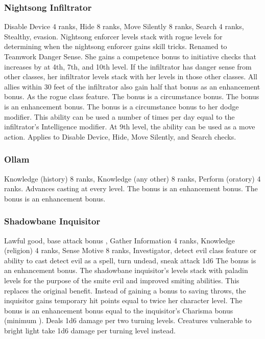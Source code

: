 \subsubsection{Nightsong Infiltrator}
 Disable Device 4 ranks, Hide 8 ranks, Move Silently 8 ranks, Search 4 ranks, Stealthy, evasion.
 Nightsong enforcer levels stack with rogue levels for determining when the nightsong enforcer gains skill tricks.
 Renamed to Teamwork Danger Sense. She gains a  competence bonus to initiative checks that increases by  at 4th, 7th, and 10th level. If the infiltrator has danger sense from other classes, her infiltrator levels stack with her levels in those other classes. All allies within 30 feet of the infiltrator also gain half that bonus as an enhancement bonus.
 As the rogue class feature.
 The bonus is a circumstance bonus.
 The bonus is an enhancement bonus.
 The bonus is a circumstance bonus to her dodge modifier.
 This ability can be used a number of times per day equal to the infiltrator's Intelligence modifier. At 9th level, the ability can be used as a move action.
 Applies to Disable Device, Hide, Move Silently, and Search checks.
\subsubsection{Ollam}
 Knowledge (history) 8 ranks, Knowledge (any other) 8 ranks, Perform (oratory) 4 ranks.
 Advances casting at every level.
 The bonus is an enhancement bonus.
 The bonus is an enhancement bonus.
\subsubsection{Shadowbane Inquisitor}
 Lawful good, base attack bonus , Gather Information 4 ranks, Knowledge (religion) 4 ranks, Sense Motive 8 ranks, Investigator, detect evil class feature or ability to cast detect evil as a spell, turn undead, sneak attack \plus1d6
 The bonus is an enhancement bonus.
 The shadowbane inquisitor's levels stack with paladin levels for the purpose of the smite evil and improved smiting abilities. This replaces the original benefit.
 Instead of gaining a bonus to saving throws, the inquisitor gains temporary hit points equal to twice her character level.
 The bonus is an enhancement bonus equal to the inquisitor's Charisma bonus (minimum ).
 Deals 1d6 damage per two turning levels. Creatures vulnerable to bright light take 1d6 damage per turning level instead.
